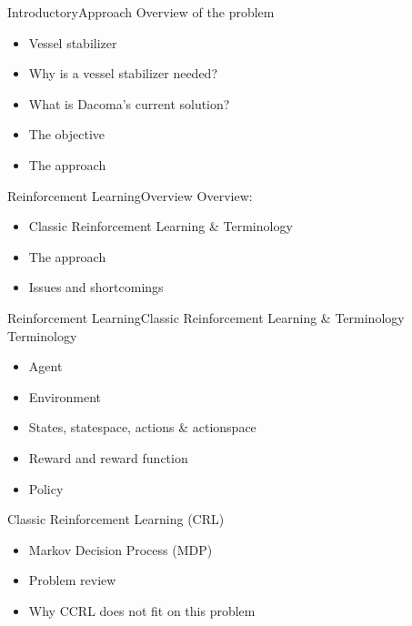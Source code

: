 \documentclass[aspectratio=169,10pt,t]{beamer}
\begin{document}
\begin{frame}{Introductory}{Approach\vphantom{(y}}
\vspace{-0.7em}
Overview of the problem
\begin{itemize}
\item Vessel stabilizer
\item Why is a vessel stabilizer needed?
\item What is Dacoma's current solution?
\item The objective
\item {\color{blue}The approach}
\end{itemize}
\end{frame}


\begin{frame}{Reinforcement Learning}{Overview\vphantom{(y}}
\vspace{-0.7em}
Overview:
\begin{itemize}
\item Classic Reinforcement Learning \& Terminology
\item The approach
\item Issues and shortcomings
\end{itemize}
\end{frame}

\begin{frame}{Reinforcement Learning}{Classic Reinforcement Learning \& Terminology\vphantom{(y}}
\vspace{-0.7em}
Terminology
\begin{itemize}
\item Agent
\item Environment
\item States, statespace, actions \& actionspace
\item Reward and reward function
\item Policy
\end{itemize}

Classic Reinforcement Learning (CRL)
\begin{itemize}
  \item Markov Decision Process (MDP)
  \item Problem review
  \item Why CCRL does not fit on this problem
\end{itemize}
\end{frame}
\end{document}
